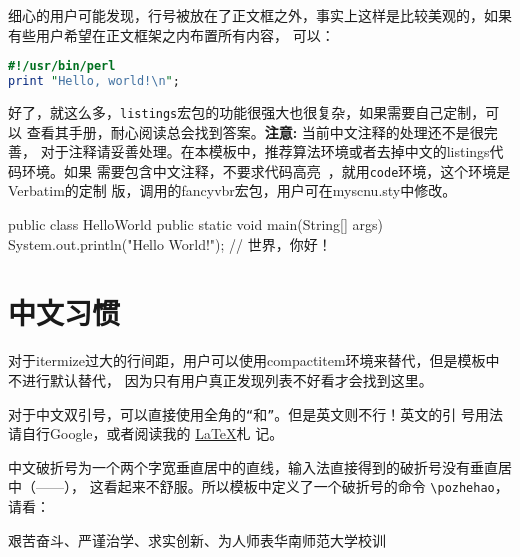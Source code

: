 细心的用户可能发现，行号被放在了正文框之外，事实上这样是比较美观的，如果有些用户希望在正文框架之内布置所有内容，
可以：
\begin{lstlisting}[language=perl,xleftmargin=2em,framexleftmargin=1.5em]
#!/usr/bin/perl
print "Hello, world!\n";
\end{lstlisting}

好了，就这么多，\texttt{listings}宏包的功能很强大也很复杂，如果需要自己定制，可以
查看其手册，耐心阅读总会找到答案。\textbf{注意:} 当前中文注释的处理还不是很完善，
对于注释请妥善处理。在本模板中，推荐算法环境或者去掉中文的listings代码环境。如果
需要包含中文注释，不要求代码高亮~，就用\texttt{code}环境，这个环境是Verbatim的定制
版，调用的fancyvbr宏包，用户可在myscnu.sty中修改。

\begin{code}
public class HelloWorld {
   public static void main(String[] args) {
      System.out.println("Hello World!");
   }
}   // 世界，你好！
\end{code}

\section{中文习惯}
\label{sec:chinese}

对于itermize过大的行间距，用户可以使用compactitem环境来替代，但是模板中不进行默认替代，
因为只有用户真正发现列表不好看才会找到这里。

对于中文双引号，可以直接使用全角的\verb|“|和\verb|”|。但是英文则不行！英文的引
号用法请自行Google，或者阅读我的
\href{https://dl.dropbox.com/u/49734213/LaTeX%E6%9C%AD%E8%AE%B0.pdf}{\LaTeX{}}札
记。

中文破折号为一个两个字宽垂直居中的直线，输入法直接得到的破折号没有垂直居中（——），
这看起来不舒服。所以模板中定义了一个破折号的命令 \verb|\pozhehao|，请看：

艰苦奋斗、严谨治学、求实创新、为人师表\hfill \pozhehao{}华南师范大学校训